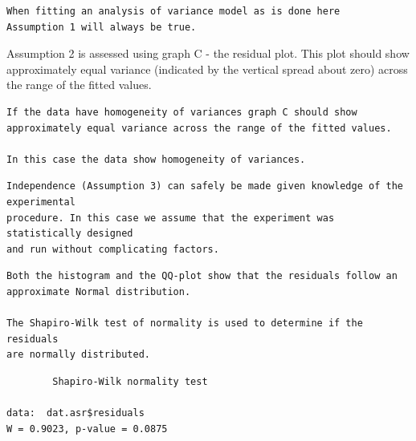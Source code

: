 \documentclass[a4paper, 10pt, fleqn, twosided]{memoir}
\begin{document}
\begin{tcolorbox}[title = Example 4 Assumption 1]
\begin{verbatim}
When fitting an analysis of variance model as is done here
Assumption 1 will always be true.
\end{verbatim}
\end{tcolorbox}


Assumption 2 is assessed using graph C - the residual plot. This plot should show approximately equal variance
(indicated by the vertical spread about zero) across the range of the fitted values.

\begin{tcolorbox}[title = Example 4 Assumption 2]
\begin{verbatim}
If the data have homogeneity of variances graph C should show
approximately equal variance across the range of the fitted values.

In this case the data show homogeneity of variances.
\end{verbatim}
\end{tcolorbox}

\begin{tcolorbox}[title = Example 4 Assumption 3]
\begin{verbatim}
Independence (Assumption 3) can safely be made given knowledge of the experimental
procedure. In this case we assume that the experiment was statistically designed
and run without complicating factors.
\end{verbatim}
\end{tcolorbox}

\begin{tcolorbox}[title = Example 4 Assumption 4]
\begin{verbatim}
Both the histogram and the QQ-plot show that the residuals follow an
approximate Normal distribution.

The Shapiro-Wilk test of normality is used to determine if the residuals
are normally distributed.
\end{verbatim}
\end{tcolorbox}

\begin{tcolorbox}[title = Example 4 Shapiro-Wilk normality test output]
\begin{verbatim}
        Shapiro-Wilk normality test

data:  dat.asr$residuals
W = 0.9023, p-value = 0.0875
\end{verbatim}
\end{tcolorbox}
\end{document}
